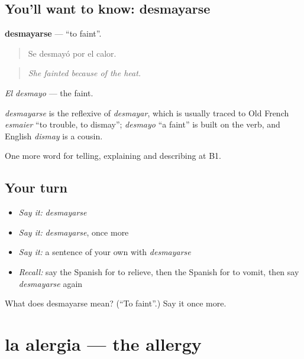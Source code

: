 \subsection*{You'll want to know: desmayarse}
\textbf{desmayarse} — \textquotedblleft{}to faint\textquotedblright{}.

\begin{quote}
Se desmayó por el calor.
\end{quote}

\begin{quote}
\emph{She fainted because of the heat.}
\end{quote}

\emph{El desmayo} — the faint.

\begin{cousinweb}
\emph{desmayarse} is the reflexive of \emph{desmayar}, which is usually traced to Old French \emph{esmaier} \textquotedblleft{}to trouble, to dismay\textquotedblright{}; \emph{desmayo} \textquotedblleft{}a faint\textquotedblright{} is built on the verb, and English \emph{dismay} is a cousin.
\end{cousinweb}

\begin{grammarlens}[title={What you've built}]
One more word for telling, explaining and describing at B1.
\end{grammarlens}

\subsection*{Your turn}
\begin{itemize}
\raggedright
  \item \emph{Say it:} \emph{desmayarse}
  \item \emph{Say it:} \emph{desmayarse}, once more
  \item \emph{Say it:} a sentence of your own with \emph{desmayarse}
  \item \emph{Recall:} say the Spanish for to relieve, then the Spanish for to vomit, then say \emph{desmayarse} again
\end{itemize}

\begin{tcolorbox}[breakable,colback=teal!4,colframe=teal!35!black,title={Before you move on}]
What does desmayarse mean? (\textquotedblleft{}To faint\textquotedblright{}.) Say it once more.
\end{tcolorbox}
\section[la alergia]{la alergia — the allergy}

